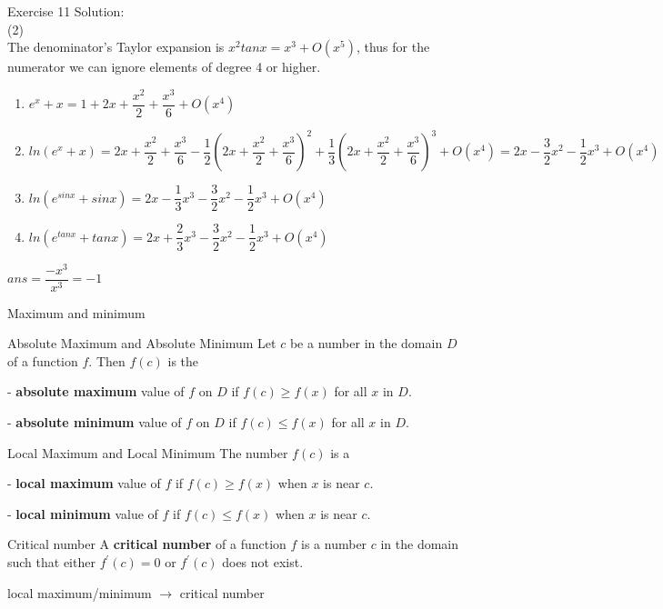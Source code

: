 \begin{frame}{Exercise 11}
    Solution:\\
    (2)\\
    The denominator's Taylor expansion is $x^2tanx=x^3+O(x^5)$, thus for the numerator we can ignore elements of degree 4 or higher.\\
    \begin{enumerate}
        \item $e^x+x=1+2x+\dfrac{x^2}{2}+\dfrac{x^3}{6}+O(x^4)$
        \item $ln(e^x+x)=2x+\dfrac{x^2}{2}+\dfrac{x^3}{6}-\dfrac{1}{2}(2x+\dfrac{x^2}{2}+\dfrac{x^3}{6})^2+\dfrac{1}{3}(2x+\dfrac{x^2}{2}+\dfrac{x^3}{6})^3+O(x^4)=2x-\dfrac{3}{2}x^2-\dfrac{1}{2}x^3+O(x^4)$
        \item $ln(e^{sinx}+sinx)=2x-\dfrac{1}{3}x^3-\dfrac{3}{2}x^2-\dfrac{1}{2}x^3+O(x^4)$
        \item$ln(e^{tanx}+tanx)=2x+\dfrac{2}{3}x^3-\dfrac{3}{2}x^2-\dfrac{1}{2}x^3+O(x^4)$
    \end{enumerate}
    \begin{center}
        $ans=\dfrac{-x^3}{x^3}=-1$
    \end{center}
    \normalsize

\end{frame}


\begin{frame}{Maximum and minimum}
    \begin{block}{Absolute Maximum and Absolute Minimum}
        Let $c$ be a number in the domain $D$ of a function $f$. Then $f(c)$ is the

        - \textbf{absolute maximum} value of $f$ on $D$ if $f(c) \geqslant f(x)$ for all $x$ in $D$.

        - \textbf{absolute minimum} value of $f$ on $D$ if $f(c) \leqslant f(x)$ for all $x$ in $D$.
    \end{block}
    \begin{block}{Local Maximum and Local Minimum}
        The number $f(c)$ is a

        - \textbf{local maximum} value of $f$ if $f(c) \geqslant f(x)$ when $x$ is near $c$.

        - \textbf{local minimum} value of $f$ if $f(c) \leqslant f(x)$ when $x$ is near $c$.
    \end{block}
    \begin{block}{Critical number}
        A \textbf{critical number} of a function $f$ is a number $c$ in the domain such that either $f^\prime (c)=0$ or $f^\prime (c)$ does not exist.
    \end{block}
    local maximum/minimum $\rightarrow$ critical number
\end{frame}



